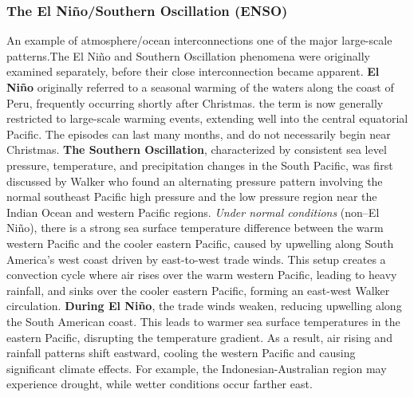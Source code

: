 \subsubsection{The El Niño/Southern Oscillation (ENSO)}
An example of atmosphere/ocean interconnections one of the major large-scale patterns.The El Niño and Southern Oscillation phenomena were originally examined separately, before their close interconnection became apparent. \newline \textbf{El Niño} originally referred to a seasonal warming of the waters along the coast of Peru, frequently occurring shortly after Christmas. the term is now generally restricted to large-scale warming events, extending well into the central equatorial Pacific. The episodes can last many months, and do not necessarily begin near Christmas. \textbf{The Southern Oscillation}, characterized by consistent sea level pressure, temperature, and precipitation changes in the South Pacific, was first discussed by Walker who found an alternating pressure pattern involving the normal southeast Pacific high pressure and the low pressure region near the Indian Ocean and western Pacific regions. \newline \textit{Under normal conditions} (non–El Niño), there is a strong sea surface temperature difference between the warm western Pacific and the cooler eastern Pacific, caused by upwelling along South America's west coast driven by east-to-west trade winds. This setup creates a convection cycle where air rises over the warm western Pacific, leading to heavy rainfall, and sinks over the cooler eastern Pacific, forming an east-west Walker circulation.
\textbf{During El Niño}, the trade winds weaken, reducing upwelling along the South American coast. This leads to warmer sea surface temperatures in the eastern Pacific, disrupting the temperature gradient. As a result, air rising and rainfall patterns shift eastward, cooling the western Pacific and causing significant climate effects. For example, the Indonesian-Australian region may experience drought, while wetter conditions occur farther east.
